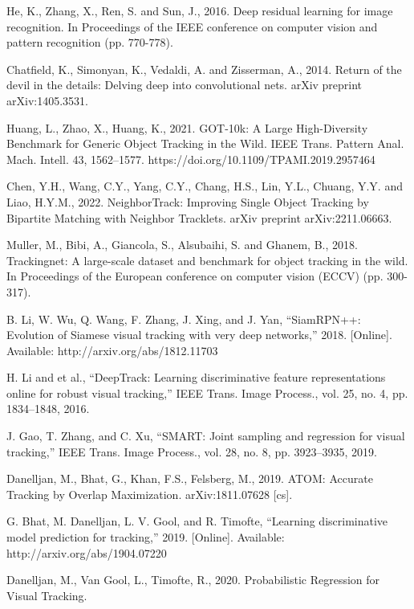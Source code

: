 \begin{thebibliography}{ widest-label }
	He, K., Zhang, X., Ren, S. and Sun, J., 2016. Deep residual learning for image recognition. In Proceedings of the IEEE conference on computer vision and pattern recognition (pp. 770-778).
	
	Chatfield, K., Simonyan, K., Vedaldi, A. and Zisserman, A., 2014. Return of the devil in the details: Delving deep into convolutional nets. arXiv preprint arXiv:1405.3531.
	
	Huang, L., Zhao, X., Huang, K., 2021. GOT-10k: A Large High-Diversity Benchmark for Generic Object Tracking in the Wild. IEEE Trans. Pattern Anal. Mach. Intell. 43, 1562–1577. https://doi.org/10.1109/TPAMI.2019.2957464
	
	
	Chen, Y.H., Wang, C.Y., Yang, C.Y., Chang, H.S., Lin, Y.L., Chuang, Y.Y. and Liao, H.Y.M., 2022. NeighborTrack: Improving Single Object Tracking by Bipartite Matching with Neighbor Tracklets. arXiv preprint arXiv:2211.06663.
	
	Muller, M., Bibi, A., Giancola, S., Alsubaihi, S. and Ghanem, B., 2018. Trackingnet: A large-scale dataset and benchmark for object tracking in the wild. In Proceedings of the European conference on computer vision (ECCV) (pp. 300-317).
	
	B. Li, W. Wu, Q. Wang, F. Zhang, J. Xing, and J. Yan, “SiamRPN++: Evolution of Siamese visual tracking with very deep networks,” 2018. [Online]. Available: http://arxiv.org/abs/1812.11703
	
	H. Li and et al., “DeepTrack: Learning discriminative feature representations online for robust visual tracking,” IEEE Trans. Image Process., vol. 25, no. 4, pp. 1834–1848, 2016.
	
	J. Gao, T. Zhang, and C. Xu, “SMART: Joint sampling and regression for visual tracking,” IEEE Trans. Image Process., vol. 28, no. 8, pp. 3923–3935, 2019.
	
	Danelljan, M., Bhat, G., Khan, F.S., Felsberg, M., 2019. ATOM: Accurate Tracking by Overlap Maximization. arXiv:1811.07628 [cs].
	
	G. Bhat, M. Danelljan, L. V. Gool, and R. Timofte, “Learning discriminative model prediction for tracking,” 2019. [Online]. Available: http://arxiv.org/abs/1904.07220
	
	
	Danelljan, M., Van Gool, L., Timofte, R., 2020. Probabilistic Regression for Visual Tracking.
	

\end{thebibliography}
